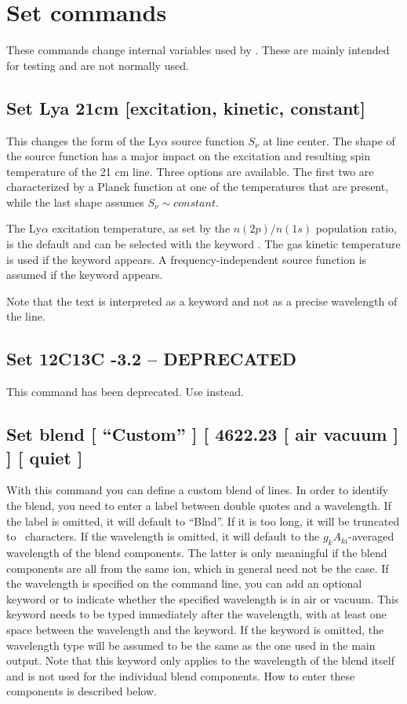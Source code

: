 \section{Set commands}

These commands change internal variables used by \Cloudy.
These are mainly
intended for testing and are not normally used.

\subsection{Set Lya 21cm [excitation, kinetic, constant]}
This changes the form of the Ly$\alpha$ source function $S_{\nu}$ at line center.
The shape of the source function has a major impact on the excitation
and resulting spin temperature of the 21 cm line.
Three options are available.  The first two are characterized by a Planck function
at one of the temperatures that are present, while the last shape assumes $S_{\nu} \sim constant$.

The Ly$\alpha$ excitation temperature, as set by the $n(2p)/n(1s)$ population ratio, is the default
and can be selected with the keyword .
The gas kinetic temperature is used if the keyword  appears.
A frequency-independent source function is assumed if the keyword  appears.

Note that the text \cdCommand{21cm} is interpreted as a keyword and not as a precise wavelength
of the line.

\subsection{Set 12C13C -3.2 -- DEPRECATED}

This command has been deprecated.
Use  instead.

\subsection{Set blend [ ``Custom'' ] [ 4622.23 [ air \OR{} vacuum ] ] [ quiet ]}

With this command you can define a custom blend of lines. In order to identify
the blend, you need to enter a label between double quotes and a wavelength.
If the label is omitted, it will default to ``Blnd''. If it is too long, it
will be truncated to \LabelLenMax\ characters. If the wavelength is omitted,
it will default to the $g_k A_{ki}$-averaged wavelength of the blend
components. The latter is only meaningful if the blend components are all from
the same ion, which in general need not be the case. If the wavelength is
specified on the command line, you can add an optional keyword 
or  to indicate whether the specified wavelength is in air
or vacuum. This keyword needs to be typed immediately after the wavelength,
with at least one space between the wavelength and the keyword. If the keyword
is omitted, the wavelength type will be assumed to be the same as the one used
in the main output. Note that this keyword only applies to the wavelength of
the blend itself and is not used for the individual blend components. How to
enter these components is described below.

